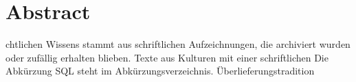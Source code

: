 \newpage
\section*{Abstract}
chtlichen Wissens stammt aus schriftlichen Aufzeichnungen, die archiviert wurden oder zufällig erhalten blieben. Texte aus Kulturen mit einer schriftlichen Die Abkürzung SQL   steht im Abkürzungsverzeichnis.  Überlieferungstradition   
\cite{1}
\cite{2}
\cite{3}

\newpage